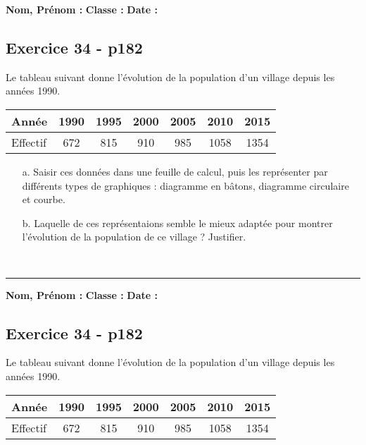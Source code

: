 \documentclass[12pt]{article}
\newcommand{\horrule}[1]{\rule{\linewidth}{#1}} %
\newcommand{\Pointille}[1][3]{\multido{}{#1}{ \makebox[\linewidth]{\dotfill}\\[\parskip]}}
\begin{document}
\textbf{Nom, Prénom :} \hspace{8cm} \textbf{Classe :} \hspace{3cm} \textbf{Date :}

\subsection*{Exercice 34 - p182}

Le tableau suivant donne l'évolution de la population d'un village depuis les années 1990.

\begin{center}
  \begin{tabular}{| l || c | c | c | c | c | c | }
    \hline
    Année     & 1990 & 1995 & 2000 & 2005 & 2010 & 2015 \\
    \hline
    Effectif &  672 &  815 &  910 &  985 & 1058 & 1354 \\ 
    \hline
  \end{tabular}
\end{center}



\begin{enumerate}
\item[a.] Saisir ces données dans une feuille de calcul, puis les représenter par différents types de graphiques : diagramme en bâtons, diagramme circulaire et courbe.
\item[b.] Laquelle de ces représentaions semble le mieux adaptée pour montrer l'évolution de la population de ce village ? Justifier. \\
\end{enumerate}

\Pointille[5] \\

\horrule{1px}
\vspace{0.3cm}

\textbf{Nom, Prénom :} \hspace{8cm} \textbf{Classe :} \hspace{3cm} \textbf{Date :}

\subsection*{Exercice 34 - p182}

Le tableau suivant donne l'évolution de la population d'un village depuis les années 1990.

\begin{center}
  \begin{tabular}{| l || c | c | c | c | c | c | }
    \hline
    Année     & 1990 & 1995 & 2000 & 2005 & 2010 & 2015 \\
    \hline
    Effectif &  672 &  815 &  910 &  985 & 1058 & 1354 \\ 
    \hline
  \end{tabular}
\end{center}
\end{document}
